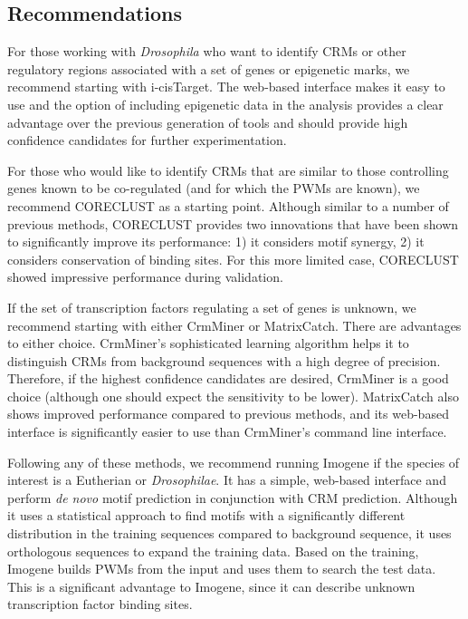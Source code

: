 \documentclass{frontiersENG} %
\begin{document}
\subsection{Recommendations} 
\label{section:recommendations}
For those working with \textit{Drosophila} who want to identify CRMs
or other regulatory regions associated with a set of genes or
epigenetic marks, we recommend starting with i-cisTarget. The
web-based interface makes it easy to use and the option of including
epigenetic data in the analysis provides a clear advantage over the
previous generation of tools and should provide high confidence
candidates for further experimentation.

For those who would like to identify CRMs that are similar to those
controlling genes known to be co-regulated (and for which the PWMs are
known), we recommend CORECLUST as a starting point. Although similar
to a number of previous methods, CORECLUST provides two innovations
that have been shown to significantly improve its performance: 1) it
considers motif synergy, 2) it considers conservation of binding
sites. For this more limited case, CORECLUST showed impressive
performance during validation.

If the set of transcription factors regulating a set of genes is
unknown, we recommend starting with either CrmMiner or
MatrixCatch. There are advantages to either choice. CrmMiner's
sophisticated learning algorithm helps it to distinguish CRMs from
background sequences with a high degree of precision. Therefore, if
the highest confidence candidates are desired, CrmMiner is a good
choice (although one should expect the sensitivity to be
lower). MatrixCatch also shows improved performance compared to
previous methods, and its web-based interface is significantly easier
to use than CrmMiner's command line interface.

Following any of these methods, we recommend running Imogene if the
species of interest is a Eutherian or \textit{Drosophilae}. It has a
simple, web-based interface and perform \textit{de novo} motif
prediction in conjunction with CRM prediction. Although it uses a
statistical approach to find motifs with a significantly different
distribution in the training sequences compared to background
sequence, it uses orthologous sequences to expand the training
data. Based on the training, Imogene builds PWMs from the input and
uses them to search the test data. This is a significant advantage to
Imogene, since it can describe unknown transcription factor binding
sites.
\end{document}
